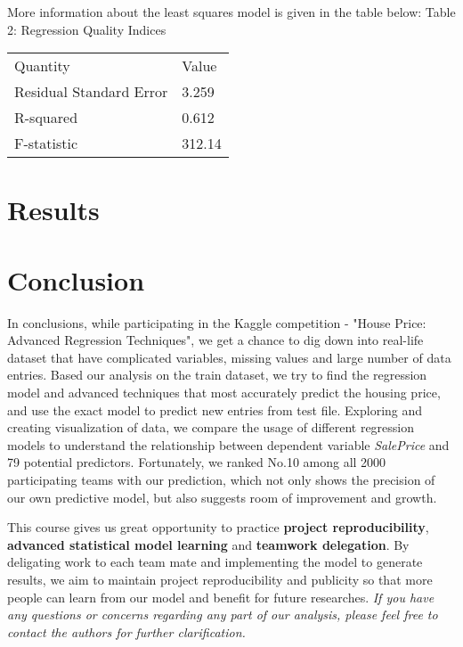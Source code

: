 \documentclass[a4paper]{article}
\begin{document}
\vspace{5mm}
More information about the least squares model is given in the table below: \newline
Table 2: Regression Quality Indices

\vspace{2mm}
\begin{tabular}{ | p{4cm} | p{2cm} | }
  \hline			
  Quantity & Value \\
  Residual Standard Error & 3.259 \\
  R-squared & 0.612 \\
  F-statistic & 312.14 \\
  \hline  
\end{tabular}

\section{Results}


\section{Conclusion}

In conclusions, while participating in the Kaggle competition - "House Price: Advanced Regression Techniques", we get a chance to dig down into real-life dataset that have complicated variables, missing values and large number of data entries. Based our analysis on the train dataset, we try to find the regression model and advanced techniques that most accurately predict the housing price, and use the exact model to predict new entries from test file. Exploring and creating visualization of data, we compare the usage of different regression models to understand the relationship between dependent variable \textit{SalePrice} and 79 potential predictors. Fortunately, we ranked No.10 among all 2000 participating teams with our prediction, which not only shows the precision of our own predictive model, but also suggests room of improvement and growth. \newline

This course gives us great opportunity to practice \textbf{project reproducibility}, \textbf{advanced statistical model learning} and \textbf{teamwork delegation}. By deligating work to each team mate and implementing the model to generate results, we aim to maintain project reproducibility and publicity so that more people can learn from our model and benefit for future researches. \textit{If you have any questions or concerns regarding any part of our analysis, please feel free to contact the authors for further clarification.} \newline
\end{document}

